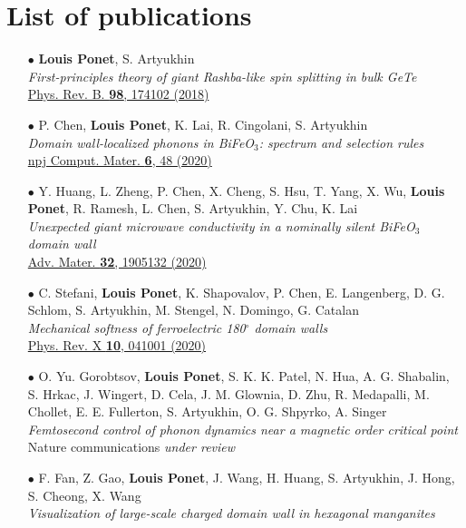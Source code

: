 \chapter{List of publications}
\begin{itemize}
	\item[$\bullet$]
	{\bf Louis Ponet}, S. Artyukhin\\
	{\it First-principles theory of giant Rashba-like spin splitting in bulk GeTe}\\
	\href{https://doi.org/10.1103/PhysRevB.98.174102}{Phys. Rev. B. {\bf 98}, 174102 (2018)}
	\item[$\bullet$]
	P. Chen, {\bf Louis Ponet}, K. Lai, R. Cingolani, S. Artyukhin\\
	{\it Domain wall-localized phonons in BiFeO$_3$: spectrum and selection rules}\\
	\href{https://doi.org/10.1038/s41524-020-0304-y}{npj Comput. Mater. {\bf 6}, 48 (2020)}
	\item[$\bullet$]
	Y. Huang, L. Zheng, P. Chen, X. Cheng, S. Hsu, T. Yang, X. Wu, {\bf Louis Ponet}, R. Ramesh, L. Chen, S. Artyukhin, Y. Chu, K. Lai\\
	{\it Unexpected giant microwave conductivity in a nominally silent BiFeO$_3$ domain wall}\\
	\href{https://doi.org/10.1002/adma.201905132}{Adv. Mater. {\bf 32}, 1905132 (2020)}
	\item[$\bullet$]
	C. Stefani, {\bf Louis Ponet}, K. Shapovalov, P. Chen, E. Langenberg, D. G. Schlom, S. Artyukhin, M. Stengel, N. Domingo, G. Catalan\\
	{\it Mechanical softness of ferroelectric 180$^\circ$ domain walls}\\ 
	\href{https://doi.org/10.1103/PhysRevX.10.041001}{Phys. Rev. X {\bf 10}, 041001 (2020)}
	\item[$\bullet$]
	O. Yu. Gorobtsov, {\bf Louis Ponet}, S. K. K. Patel, N. Hua, A. G. Shabalin, S. Hrkac, J. Wingert, D. Cela, J. M. Glownia, D. Zhu, R. Medapalli, M. Chollet, E. E. Fullerton, S. Artyukhin, O. G. Shpyrko, A. Singer\\
	{\it Femtosecond control of phonon dynamics near a magnetic order critical point}\\
	Nature communications {\it under review}
	\item[$\bullet$]
	F. Fan, Z. Gao, {\bf Louis Ponet}, J. Wang, H. Huang, S. Artyukhin, J. Hong, S. Cheong, X. Wang\\
	{\it Visualization of large-scale charged domain wall in hexagonal manganites}\\

\end{itemize}
